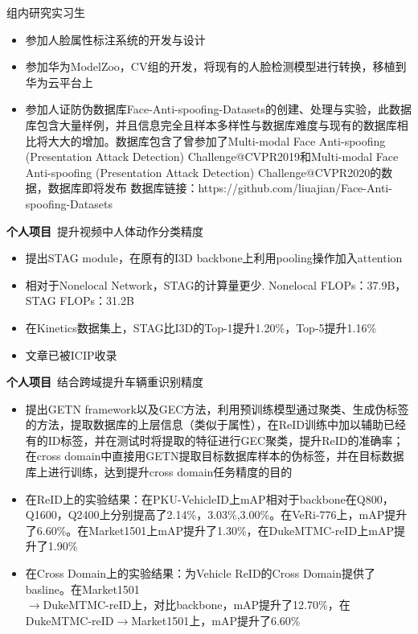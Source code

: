 \documentclass{resume}
\begin{document}
组内研究实习生
\begin{itemize}
  \item 参加人脸属性标注系统的开发与设计
  \item 参加华为ModelZoo，CV组的开发，将现有的人脸检测模型进行转换，移植到华为云平台上
  \item 参加人证防伪数据库Face-Anti-spoofing-Datasets的创建、处理与实验，此数据库包含大量样例，并且信息完全且样本多样性与数据库难度与现有的数据库相比将大大的增加。数据库包含了曾参加了Multi-modal Face Anti-spoofing  (Presentation Attack Detection) Challenge@CVPR2019和Multi-modal Face Anti-spoofing  (Presentation Attack Detection) Challenge@CVPR2020的数据，数据库即将发布
  数据库链接：https://github.com/liuajian/Face-Anti-spoofing-Datasets
\end{itemize}

{\textbf{个人项目}\ }{提升视频中人体动作分类精度}
\begin{itemize}
  \item 提出STAG module，在原有的I3D backbone上利用pooling操作加入attention
  \item 相对于Nonelocal Network，STAG的计算量更少. Nonelocal FLOPs：37.9B，STAG FLOPs：31.2B
  \item 在Kinetics数据集上，STAG比I3D的Top-1提升1.20\%，Top-5提升1.16\%
  \item 文章已被ICIP收录
\end{itemize}

{\textbf{个人项目}\ }{结合跨域提升车辆重识别精度}
\begin{itemize}
  \item 提出GETN framework以及GEC方法，利用预训练模型通过聚类、生成伪标签的方法，提取数据库的上层信息（类似于属性），在ReID训练中加以辅助已经有的ID标签，并在测试时将提取的特征进行GEC聚类，提升ReID的准确率；在cross domain中直接用GETN提取目标数据库样本的伪标签，并在目标数据库上进行训练，达到提升cross domain任务精度的目的
  \item 在ReID上的实验结果：在PKU-VehicleID上mAP相对于backbone在Q800，Q1600，Q2400上分别提高了2.14\%，3.03\%,3.00\%。在VeRi-776上，mAP提升了6.60\%。在Market1501上mAP提升了1.30\%，在DukeMTMC-reID上mAP提升了1.90\%
  \item 在Cross Domain上的实验结果：为Vehicle ReID的Cross Domain提供了basline。在Market1501\\$\longrightarrow$DukeMTMC-reID上，对比backbone，mAP提升了12.70\%，在DukeMTMC-reID$\longrightarrow$Market1501上，mAP提升了6.60\%
\end{itemize}
\end{document}
